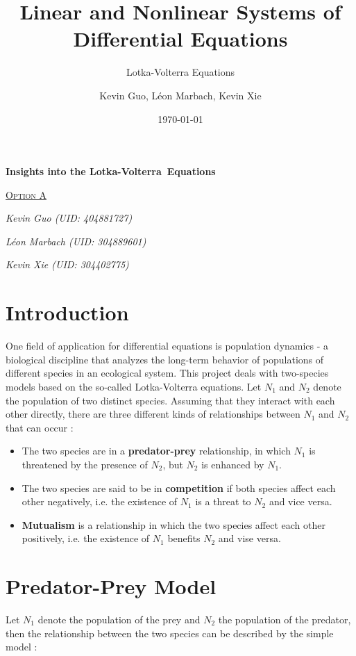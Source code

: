 \documentclass[11pt,a4paper]{scrartcl}
\title{Linear and Nonlinear Systems of Differential Equations}
\subtitle{Lotka-Volterra Equations}
\author{Kevin Guo, Léon Marbach, Kevin Xie}
\date{\today}
\theoremstyle{definition}
\begin{document}
\begin{titlepage}
	\centering
	{\Huge\bfseries Insights into the Lotka-Volterra~Equations \par}
	\vspace{2cm}
	{\scshape\LARGE \underline{Option A} \par}
	\vspace{7cm}
	{\LARGE\itshape Kevin Guo (UID: 404881727)\par}
	\vspace{.9em}
	{\LARGE\itshape Léon Marbach (UID: 304889601)\par}
	\vspace{.9em}
	{\LARGE\itshape Kevin Xie (UID: 304402775)\par}
	\vspace{.9em}

	\vfill

\end{titlepage}
\tableofcontents

\section{Introduction}
One field of application for differential equations is population dynamics - a biological discipline that analyzes the long-term behavior of populations of different species in an ecological system. This project deals with two-species models based on the so-called Lotka-Volterra equations. Let $N_1$ and $N_2$ denote the population of two distinct species. Assuming that they interact with each other directly, there are three different kinds of relationships between $N_1$ and $N_2$ that can occur \cite{Murray}:

\begin{itemize}
	\item{The two species are in a \textbf{predator-prey} relationship, in which $N_1$ is threatened by the presence of $N_2$, but $N_2$ is enhanced by $N_1$.}
	\item{The two species are said to be in \textbf{competition} if both species affect each other negatively, i.e. the existence of $N_1$ is a threat to $N_2$ and vice versa.}
	\item{\textbf{Mutualism} is a relationship in which the two species affect each other positively, i.e. the existence of $N_1$ benefits $N_2$ and vise versa.}
\end{itemize}

\section{Predator-Prey Model}
Let $N_1$ denote the population of the prey and $N_2$ the population of the predator, then the relationship between the two species can be described by the simple model \cite{Haberman}:
\end{document}
